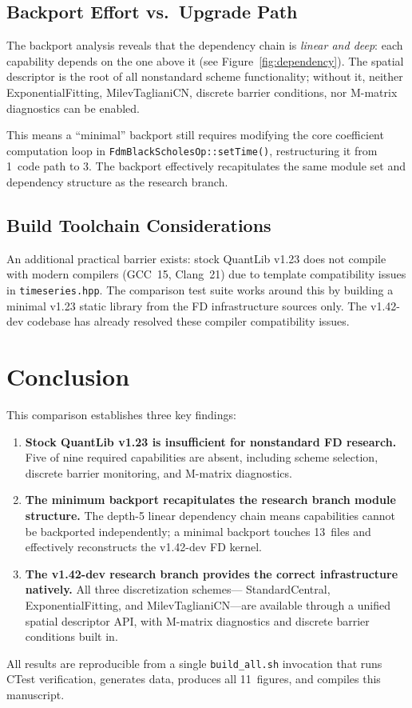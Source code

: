 \documentclass[11pt]{article}
\begin{document}
\subsection{Backport Effort vs.\ Upgrade Path}

The backport analysis reveals that the dependency chain is \emph{linear
and deep}: each capability depends on the one above it (see
Figure~\ref{fig:dependency}). The spatial descriptor is the root of all
nonstandard scheme functionality; without it, neither ExponentialFitting,
MilevTaglianiCN, discrete barrier conditions, nor M-matrix diagnostics
can be enabled.

This means a ``minimal'' backport still requires modifying the core
coefficient computation loop in \texttt{FdmBlackScholesOp::setTime()},
restructuring it from 1~code path to 3. The backport effectively
recapitulates the same module set and dependency structure as the research
branch.

\subsection{Build Toolchain Considerations}

An additional practical barrier exists: stock QuantLib v1.23 does not
compile with modern compilers (GCC~15, Clang~21) due to template
compatibility issues in \texttt{timeseries.hpp}. The comparison test
suite works around this by building a minimal v1.23 static library from
the FD infrastructure sources only. The v1.42-dev codebase has already
resolved these compiler compatibility issues.

\section{Conclusion}
\label{sec:conclusion}

This comparison establishes three key findings:

\begin{enumerate}
  \item \textbf{Stock QuantLib v1.23 is insufficient for nonstandard FD
    research.} Five of nine required capabilities are absent, including
    scheme selection, discrete barrier monitoring, and M-matrix diagnostics.

  \item \textbf{The minimum backport recapitulates the research branch
    module structure.} The depth-5 linear dependency chain means
    capabilities cannot be backported independently; a minimal backport
    touches 13~files and effectively reconstructs the v1.42-dev FD kernel.

  \item \textbf{The v1.42-dev research branch provides the correct
    infrastructure natively.} All three discretization schemes---
    StandardCentral, ExponentialFitting, and MilevTaglianiCN---are
    available through a unified spatial descriptor API, with M-matrix
    diagnostics and discrete barrier conditions built in.
\end{enumerate}

All results are reproducible from a single \texttt{build\_all.sh}
invocation that runs CTest verification, generates data, produces all
11~figures, and compiles this manuscript.



\end{document}
